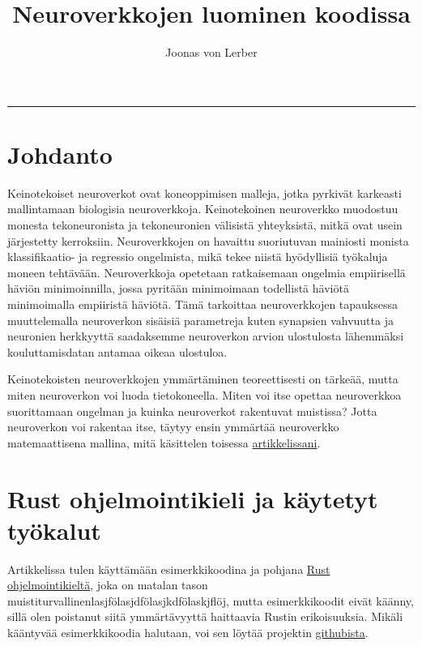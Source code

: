 \documentclass{article}
\author{Joonas von Lerber}
\title{Neuroverkkojen luominen koodissa}
\begin{document}
\maketitle

\tableofcontents

\vskip15pt
\hrule
\vskip15pt

\section{Johdanto}

Keinotekoiset neuroverkot ovat koneoppimisen malleja, jotka pyrkivät karkeasti mallintamaan biologisia neuroverkkoja.
Keinotekoinen neuroverkko muodostuu monesta tekoneuronista ja tekoneuronien välisistä yhteyksistä, mitkä ovat usein
järjestetty kerroksiin. Neuroverkkojen on havaittu suoriutuvan mainiosti monista klassifikaatio- ja regressio ongelmista,
mikä tekee niistä hyödyllisiä työkaluja moneen tehtävään. Neuroverkkoja opetetaan ratkaisemaan ongelmia empiirisellä
häviön minimoinnilla\cite{vapnik1999nature}, jossa pyritään minimoimaan todellistä häviötä minimoimalla empiiristä häviötä.
Tämä tarkoittaa neuroverkkojen tapauksessa muuttelemalla neuroverkon sisäisiä parametreja kuten synapsien vahvuutta ja neuronien
herkkyyttä saadaksemme neuroverkon arvion ulostulosta lähemmäksi kouluttamisdatan antamaa oikeaa ulostuloa.

Keinotekoisten neuroverkkojen ymmärtäminen teoreettisesti on tärkeää, mutta miten neuroverkon voi luoda tietokoneella.
Miten voi itse opettaa neuroverkkoa suorittamaan ongelman ja kuinka neuroverkot rakentuvat muistissa? %
Jotta neuroverkon voi rakentaa itse, täytyy ensin ymmärtää neuroverkko matemaattisena mallina, mitä käsittelen toisessa \href{http://example.com}{artikkelissani}. %

\section{Rust ohjelmointikieli ja käytetyt työkalut}

Artikkelissa tulen käyttämään esimerkkikoodina ja pohjana \href {https://www.rust-lang.org/}{Rust ohjelmointikieltä}, joka on matalan tason muistiturvallinenlasjfölasjdfölasjkdfölaskjflöj,%
mutta esimerkkikoodit eivät käänny, sillä olen poistanut siitä ymmärtävyyttä haittaavia Rustin erikoisuuksia. Mikäli kääntyvää esimerkkikoodia halutaan,
voi sen löytää projektin \href{https://github.com/Joonas-vonlerber/rusticneurons}{githubista}.
\end{document}
